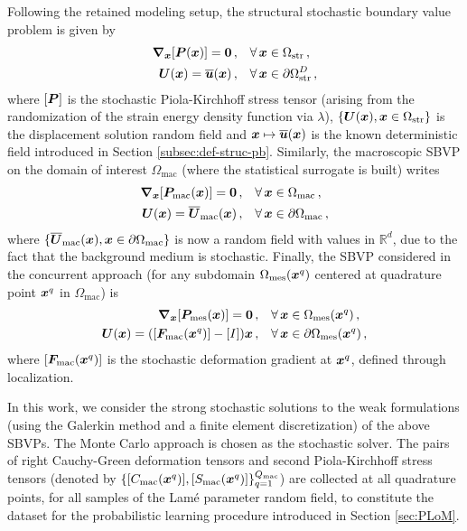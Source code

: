 Following the retained modeling setup, the structural stochastic boundary value problem is given by
\begin{align}
    \boldsymbol{\nabla}_{{\boldsymbol{x}}} [{\boldsymbol{P}}({\boldsymbol{x}})]  = \mathbf{0}\,,& \quad \forall\,{\boldsymbol{x}} \in \Omega_\text{str}\,, \label{eq: stress divergence structural}\\
    {\boldsymbol{U}}({\boldsymbol{x}}) = \overline{{\boldsymbol{u}}}({\boldsymbol{x}})\,,& \quad \forall\, {\boldsymbol{x}} \in \partial \Omega_\text{str}^D\,,\label{eq: structural-sto-bc}
\end{align}
where $[{\boldsymbol{P}}]$ is the stochastic Piola-Kirchhoff stress tensor (arising from the randomization of the strain energy density function via $\lambda$), $\{{\boldsymbol{U}}({\boldsymbol{x}}),{\boldsymbol{x}}\in \Omega_\text{str}\}$ is the displacement solution random field and ${\boldsymbol{x}} \mapsto \overline{{\boldsymbol{u}}}({\boldsymbol{x}})$ is the known deterministic field introduced in Section \ref{subsec:def-struc-pb}. Similarly, the macroscopic SBVP on the domain of interest $\Omega_\text{mac}$ (where the statistical surrogate is built) writes
\begin{align}
    \boldsymbol{\nabla}_{{\boldsymbol{x}}} [{\boldsymbol{P}}_\text{mac}({\boldsymbol{x}})] = {\mathbf{0}}\,,& \quad \forall\,{\boldsymbol{x}} \in \Omega_\text{mac}\,,\\
    {\boldsymbol{U}}({\boldsymbol{x}}) = \overline{{\boldsymbol{U}}}_{\text{mac}}({\boldsymbol{x}})\,,& \quad \forall\, {\boldsymbol{x}} \in \partial \Omega_\text{mac}\,,
\end{align}
where $\{\overline{{\boldsymbol{U}}}_{\text{mac}}({\boldsymbol{x}}), {\boldsymbol{x}} \in \partial \Omega_\text{mac}\}$ is now a random field with values in $\mathbb{R}^d$, due to the fact that the background medium is stochastic. Finally, the SBVP considered in the concurrent approach (for any subdomain $\Omega_\text{mes}({\boldsymbol{x}}^{q})$ centered at quadrature point ${\boldsymbol{x}}^{q}$ in $\Omega_\text{mac}$) is
\begin{align}
    \boldsymbol{\nabla}_{{\boldsymbol{x}}} [{\boldsymbol{P}}_\text{mes}({\boldsymbol{x}})] = {\mathbf{0}}\,,& \quad \forall\,{\boldsymbol{x}} \in \Omega_\text{mes}({\boldsymbol{x}}^{q})\,,\\
    {\boldsymbol{U}}({\boldsymbol{x}}) = ([{\boldsymbol{F}}_\text{mac}({\boldsymbol{x}}^{q})] - [I]) {\boldsymbol{x}} \,,& \quad \forall\, {\boldsymbol{x}} \in \partial \Omega_\text{mes}({\boldsymbol{x}}^{q})\,,
\end{align}
where $[{\boldsymbol{F}}_\text{mac}({\boldsymbol{x}}^{q})]$ is the stochastic deformation gradient at ${\boldsymbol{x}}^{q}$, defined through localization.

In this work, we consider the strong stochastic solutions to the weak formulations (using the Galerkin method and a finite element discretization) of the above SBVPs. The Monte Carlo approach is chosen as the stochastic solver. The pairs of right Cauchy-Green deformation tensors and second Piola-Kirchhoff stress tensors (denoted by $\{[C_\text{mac}({\boldsymbol{x}}^{q})],[S_\text{mac}({\boldsymbol{x}}^{q})]\}_{q = 1}^{Q_\text{mac}}$) are collected at all quadrature points, for all samples of the Lam\'e parameter random field, to constitute the dataset for the probabilistic learning procedure introduced in Section \ref{sec:PLoM}.

